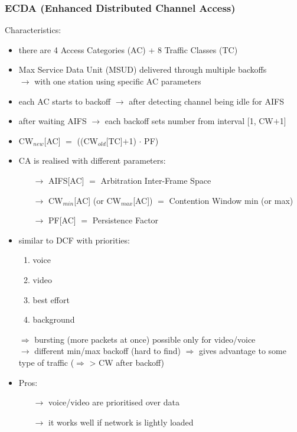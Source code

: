 \subsubsection{ECDA (Enhanced Distributed Channel Access)}
Characteristics:
\begin{itemize}
    \item there are 4 Access Categories (AC) + 8 Traffic Classes (TC)
    \item Max Service Data Unit (MSUD) delivered through multiple backoffs\\[0.15cm]
    $\rightarrow$ with one station using specific AC parameters
    \item each AC starts to backoff $\rightarrow$ after detecting channel being idle for AIFS
    \item after waiting AIFS $\rightarrow$ each backoff sets number from interval [1, CW$+$1]
    \item CW$_{new}$[AC] $=$ ((CW$_{old}$[TC]$+$1) $\cdot$ PF)
    \item CA is realised with different parameters:
    \begin{itemize}
        \item[$\rightarrow$] AIFS[AC] $=$ Arbitration Inter-Frame Space
        \item[$\rightarrow$] CW$_{min}$[AC] (or CW$_{max}$[AC]) $=$ Contention Window min (or max)
        \item[$\rightarrow$] PF[AC] $=$ Persistence Factor
    \end{itemize}
    \item similar to DCF with priorities:
    \begin{enumerate}
        \item voice
        \item video
        \item best effort
        \item background
    \end{enumerate}
    $\Rightarrow$ bursting (more packets at once) possible only for video/voice\\[0.15cm]
    $\rightarrow$ different min/max backoff (hard to find) $\Rightarrow$ gives advantage to some type of traffic ($\Rightarrow$ > CW after backoff)
    \item Pros:
    \begin{itemize}
        \item[$\rightarrow$] voice/video are prioritised over data
        \item[$\rightarrow$] it works well if network is lightly loaded

\end{itemize}
\end{itemize}
